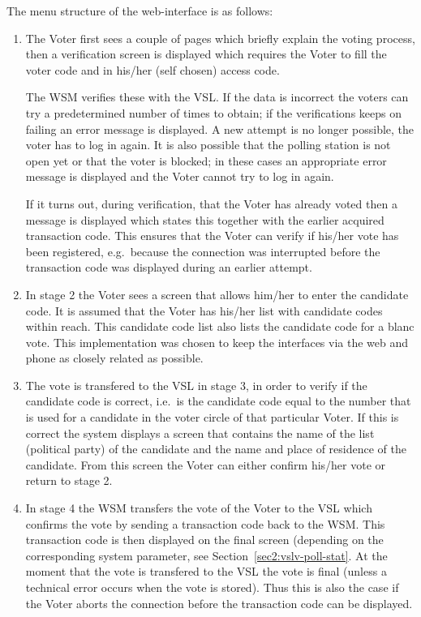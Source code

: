 The menu structure of the web-interface is as follows:

\begin{enumerate}
	\item The Voter first sees a couple of pages which briefly
	explain the voting process, then a verification screen is
	displayed which requires the Voter to fill the voter code and
	in his/her (self chosen) access code.

	The WSM verifies these with the VSL. If the data is incorrect
	the voters can try a predetermined number of times to obtain;
	if the verifications keeps on failing an error message is
	displayed. A new attempt is no longer possible, the voter has
	to log in again. It is also possible that the polling station
	is not open yet or that the voter is blocked; in these cases
	an appropriate error message is displayed and the Voter cannot
	try to log in again.

	If it turns out, during verification, that the Voter has
	already voted then a message is displayed which states this
	together with the earlier acquired transaction code. This
	ensures that the Voter can verify if his/her vote has been
	registered, e.g.\ because the connection was interrupted
	before the transaction code was displayed during an earlier
	attempt. 

	\item In stage 2 the Voter sees a screen that allows him/her
	to enter the candidate code. It is assumed that the Voter has
	his/her list with candidate codes within reach. This candidate
	code list also lists the candidate code for a blanc vote. This
	implementation was chosen to keep the interfaces via the web
	and phone as closely related as possible.

	\item The vote is transfered to the VSL in stage 3, in order
	to verify if the candidate code is correct, i.e.\ is the
	candidate code equal to the number that is used for a
	candidate in the voter circle of that particular Voter. If
	this is correct the system displays a screen that contains the
	name of the list (political party) of the candidate and the
	name and place of residence of the candidate. From this screen
	the Voter can either confirm his/her vote or return to stage
	2.

	\item In stage 4 the WSM transfers the vote of the Voter to
	the VSL which confirms the vote by sending a transaction code
	back to the WSM. This transaction code is then displayed on
	the final screen (depending on the corresponding system
	parameter, see Section~\ref{sec2:vslv-poll-stat}. At the
	moment that the vote is transfered to the VSL the vote is
	final (unless a technical error occurs when the vote is
	stored). Thus this is also the case if the Voter aborts the
	connection before the transaction code can be displayed.

\end{enumerate}

